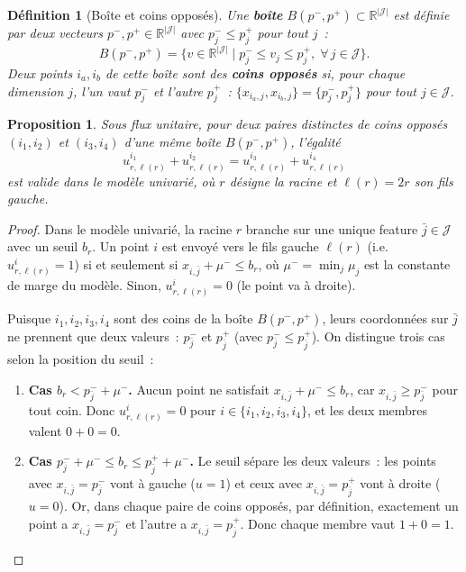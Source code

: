 \documentclass[a4paper,10pt,titlepage,leqno]{article}
\newtheorem{proposition}{Proposition}
\newtheorem{definition}{Définition}
\begin{document}
\begin{theorybox}

\begin{definition}[Boîte et coins opposés]
Une \textbf{boîte} $B(p^-, p^+) \subset \mathbb{R}^{|\mathcal{J}|}$ est définie par deux vecteurs $p^-, p^+ \in \mathbb{R}^{|\mathcal{J}|}$ avec $p^-_j \leq p^+_j$ pour tout $j$~:
\[
  B(p^-, p^+) = \bigl\{ v \in \mathbb{R}^{|\mathcal{J}|} \;\big|\; p^-_j \leq v_j \leq p^+_j, \;\forall\, j \in \mathcal{J} \bigr\}.
\]
Deux points $i_a, i_b$ de cette boîte sont des \textbf{coins opposés} si, pour chaque dimension $j$, l'un vaut $p^-_j$ et l'autre $p^+_j$~: $\{x_{i_a, j}, x_{i_b, j}\} = \{p^-_j, p^+_j\}$ pour tout $j \in \mathcal{J}$.
\end{definition}

\begin{proposition}
Sous flux unitaire, pour deux paires distinctes de coins opposés $(i_1,i_2)$ et $(i_3,i_4)$ d'une même boîte $B(p^-, p^+)$, l'égalité
\[
u^{i_1}_{r,\ell(r)} + u^{i_2}_{r,\ell(r)} = u^{i_3}_{r,\ell(r)} + u^{i_4}_{r,\ell(r)}
\]
est valide dans le modèle univarié, où $r$ désigne la racine et $\ell(r) = 2r$ son fils gauche.
\end{proposition}

\begin{proof}
Dans le modèle univarié, la racine $r$ branche sur une unique feature $\bar{j} \in \mathcal{J}$ avec un seuil $b_r$. Un point $i$ est envoyé vers le fils gauche $\ell(r)$ (i.e.\ $u^i_{r,\ell(r)} = 1$) si et seulement si $x_{i,\bar{j}} + \mu^- \leq b_r$, où $\mu^- = \min_j \mu_j$ est la constante de marge du modèle. Sinon, $u^i_{r,\ell(r)} = 0$ (le point va à droite).

Puisque $i_1, i_2, i_3, i_4$ sont des coins de la boîte $B(p^-, p^+)$, leurs coordonnées sur $\bar{j}$ ne prennent que deux valeurs~: $p^-_{\bar{j}}$ et $p^+_{\bar{j}}$ (avec $p^-_{\bar{j}} \leq p^+_{\bar{j}}$). On distingue trois cas selon la position du seuil~:

\begin{enumerate}[leftmargin=2em]
  \item \textbf{Cas $b_r < p^-_{\bar{j}} + \mu^-$.} Aucun point ne satisfait $x_{i,\bar{j}} + \mu^- \leq b_r$, car $x_{i,\bar{j}} \geq p^-_{\bar{j}}$ pour tout coin. Donc $u^i_{r,\ell(r)} = 0$ pour $i \in \{i_1, i_2, i_3, i_4\}$, et les deux membres valent $0 + 0 = 0$.

  \item \textbf{Cas $p^-_{\bar{j}} + \mu^- \leq b_r \leq p^+_{\bar{j}} + \mu^-$.} Le seuil sépare les deux valeurs~: les points avec $x_{i,\bar{j}} = p^-_{\bar{j}}$ vont à gauche ($u = 1$) et ceux avec $x_{i,\bar{j}} = p^+_{\bar{j}}$ vont à droite ($u = 0$). Or, dans chaque paire de coins opposés, par définition, exactement un point a $x_{i,\bar{j}} = p^-_{\bar{j}}$ et l'autre a $x_{i,\bar{j}} = p^+_{\bar{j}}$. Donc chaque membre vaut $1 + 0 = 1$.


\end{enumerate}
\end{proof}
\end{theorybox}
\end{document}
